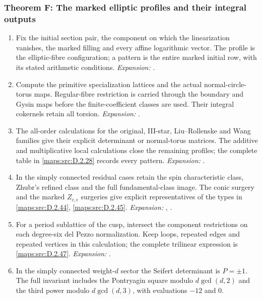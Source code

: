 \subsubsection*{Theorem F: The marked elliptic profiles and their integral outputs}
\begin{enumerate}[label=\arabic*.,leftmargin=*]
\item\hypertarget{step-III-F-1}{} Fix the initial section pair, the component on which the
linearization vanishes, the marked filling and every affine
logarithmic vector.  The profile is the elliptic-fibre configuration;
a pattern is the entire marked initial row, with its stated
arithmetic conditions.
\textit{Expansion:} .
\item\hypertarget{step-III-F-2}{} Compute the primitive specialization lattices and the actual
normal-circle-torus maps.  Regular-fibre restriction is carried
through the boundary and Gysin maps before the finite-coefficient
classes are used.  Their integral cokernels retain all torsion.
\textit{Expansion:} .
\item\hypertarget{step-III-F-3}{} The all-order calculations for the original, III-star,
Liu--Rollenske and Wang families give their explicit determinant
or normal-torus matrices.  The additive and multiplicative local
calculations close the remaining profiles; the complete table in
\cref{maps:src:D.2.28} records every pattern.
\textit{Expansion:} .
\item\hypertarget{step-III-F-4}{} In the simply connected residual cases retain the spin
characteristic class, Zhubr's refined class and the full
fundamental-class image.  The conic surgery and the marked
$Z_{c,\epsilon}$ surgeries give explicit representatives of the
types in \cref{maps:src:D.2.44}, \cref{maps:src:D.2.45}.
\textit{Expansion:} , .
\item\hypertarget{step-III-F-5}{} For a period sublattice of the cusp, intersect the component
restrictions on each degree-six del Pezzo normalization.  Keep
loops, repeated edges and repeated vertices in this calculation;
the complete trilinear expression is
\cref{maps:src:D.2.47}.
\textit{Expansion:} .
\item\hypertarget{step-III-F-6}{} In the simply connected weight-$d$ sector the Seifert
determinant is $P=\pm1$.  The full invariant includes the
Pontryagin square modulo $d\gcd(d,2)$ and the third power
modulo $d\gcd(d,3)$, with evaluations $-12$ and $0$.

\end{enumerate}
